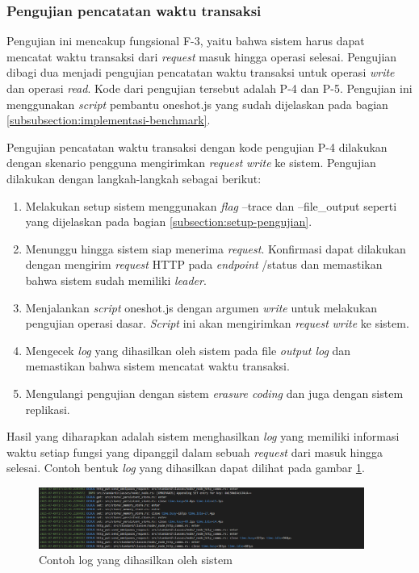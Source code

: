 \subsubsection{Pengujian pencatatan waktu transaksi}
\label{subsubsection:pengujian-pencatatan-waktu-transaksi}

Pengujian ini mencakup fungsional F-3, yaitu bahwa sistem harus dapat mencatat waktu transaksi dari \textit{request} masuk hingga operasi selesai. Pengujian dibagi dua menjadi pengujian pencatatan waktu transaksi untuk operasi \textit{write} dan operasi \textit{read}. Kode dari pengujian tersebut adalah P-4 dan P-5. Pengujian ini menggunakan \textit{script} pembantu oneshot.js yang sudah dijelaskan pada bagian \ref{subsubsection:implementasi-benchmark}.

Pengujian pencatatan waktu transaksi dengan kode pengujian P-4 dilakukan dengan skenario pengguna mengirimkan \textit{request} \textit{write} ke sistem. Pengujian dilakukan dengan langkah-langkah sebagai berikut:

\begin{enumerate}
  \item Melakukan setup sistem menggunakan \textit{flag} --trace dan --file\_output seperti yang dijelaskan pada bagian \ref{subsection:setup-pengujian}.
  \item Menunggu hingga sistem siap menerima \textit{request}. Konfirmasi dapat dilakukan dengan mengirim \textit{request} HTTP pada \textit{endpoint} /status dan memastikan bahwa sistem sudah memiliki \textit{leader}.
  \item Menjalankan \textit{script} oneshot.js dengan argumen \textit{write} untuk melakukan pengujian operasi dasar. \textit{Script} ini akan mengirimkan \textit{request} \textit{write} ke sistem.
  \item Mengecek \textit{log} yang dihasilkan oleh sistem pada file \textit{output log} dan memastikan bahwa sistem mencatat waktu transaksi.
  \item Mengulangi pengujian dengan sistem \textit{erasure coding} dan juga dengan sistem replikasi.
\end{enumerate}

Hasil yang diharapkan adalah sistem menghasilkan \textit{log} yang memiliki informasi waktu setiap fungsi yang dipanggil dalam sebuah \textit{request} dari masuk hingga selesai. Contoh bentuk \textit{log} yang dihasilkan dapat dilihat pada gambar \ref{fig:log-trace}.

\begin{figure}[ht]
    \centering
    \includegraphics[width=0.95\textwidth]{resources/chapter-4/log-trace.png}
    \caption{Contoh log yang dihasilkan oleh sistem}
    \label{fig:log-trace}
\end{figure}

